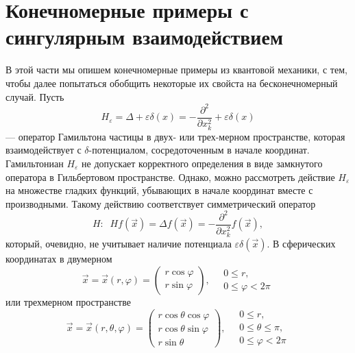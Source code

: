 \documentclass[12pt]{article}
\newcommand{\ve}{\varepsilon}
\begin{document}
\section{Конечномерные примеры с сингулярным взаимодействием}
    В этой части мы опишем конечномерные примеры из квантовой механики,
    с тем, чтобы далее попытаться обобщить некоторые их свойста на
    бесконечномерный случай.
    Пусть
\begin{equation*}
    H_{\ve} = \Delta + \ve \delta(x)
	= -\frac{\partial^{2}}{\partial x_{k}^{2}}
	    + \ve \delta(x)
\end{equation*}
    --- оператор Гамильтона частицы в двух- или трех-мерном пространстве,
    которая взаимодействует с
$ \delta $-потенциалом, сосредоточенным в начале координат.
    Гамильтониан
$ H_{\ve} $
    не допускает корректного определения в виде замкнутого оператора
    в Гильбертовом пространстве.
    Однако, можно рассмотреть действие
$ H_{\ve} $
    на множестве
    гладких функций, убывающих в начале координат вместе
    с производными.
    Такому действию соответствует симметрический оператор
\begin{equation*}
    H: \;\; H f(\vec{x}) = \Delta f(\vec{x}) =
	-\frac{\partial^{2}}{\partial x_{k}^{2}} f(\vec{x}) ,
\end{equation*}
    который, очевидно, не учитывает наличие потенциала
$ \ve \delta(\vec{x}) $.
    В сферических координатах в двумерном
\begin{equation*}
    \vec{x} = \vec{x}(r,\varphi)
    = \begin{pmatrix} r\cos\varphi\\
        r\sin\varphi
        \end{pmatrix}, \quad
    \begin{array}{l}
	0 \leq r,\\ 0 \leq\varphi < 2\pi
    \end{array}
\end{equation*}
    или трехмерном пространстве
\begin{equation}
\label{sphchange}
    \vec{x} = \vec{x}(r,\theta,\varphi)
    = \begin{pmatrix} r\cos\theta \cos\varphi\\
        r\cos\theta \sin\varphi\\
        r\sin\theta
        \end{pmatrix}, \quad
    \begin{array}{l}
	0 \leq r, \\
	0 \leq\theta\leq\pi,\\
	0 \leq\varphi < 2\pi
    \end{array}
\end{equation}
\end{document}
